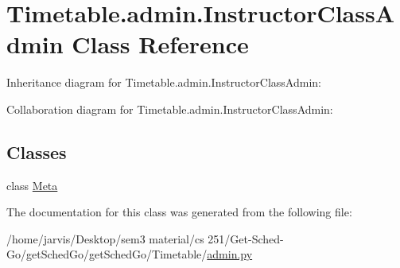 \hypertarget{classTimetable_1_1admin_1_1InstructorClassAdmin}{}\section{Timetable.\+admin.\+Instructor\+Class\+Admin Class Reference}
\label{classTimetable_1_1admin_1_1InstructorClassAdmin}


Inheritance diagram for Timetable.\+admin.\+Instructor\+Class\+Admin\+:


Collaboration diagram for Timetable.\+admin.\+Instructor\+Class\+Admin\+:
\subsection*{Classes}
\begin{DoxyCompactItemize}
\item 
class \hyperlink{classTimetable_1_1admin_1_1InstructorClassAdmin_1_1Meta}{Meta}
\end{DoxyCompactItemize}


The documentation for this class was generated from the following file\+:\begin{DoxyCompactItemize}
\item 
/home/jarvis/\+Desktop/sem3 material/cs 251/\+Get-\/\+Sched-\/\+Go/get\+Sched\+Go/get\+Sched\+Go/\+Timetable/\hyperlink{Timetable_2admin_8py}{admin.\+py}\end{DoxyCompactItemize}
